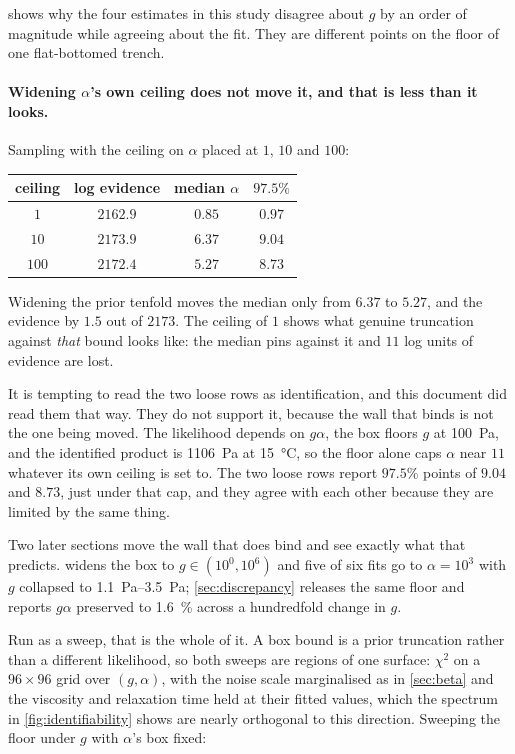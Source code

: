\documentclass[10pt]{article}
\begin{document}
 shows why the four estimates in this study disagree about $g$ by an order of
magnitude while agreeing about the fit. They are different points on the floor of one
flat-bottomed trench.

\paragraph{Widening $\alpha$'s own ceiling does not move it, and that is less than it looks.}
Sampling with the ceiling on $\alpha$ placed at $1$, $10$ and $100$:

\begin{center}
\begin{tabular}{cccc}
\toprule
ceiling & log evidence & median $\alpha$ & $97.5\%$ \\
\midrule
$1$ & $2162.9$ & $0.85$ & $0.97$ \\
$10$ & $2173.9$ & $6.37$ & $9.04$ \\
$100$ & $2172.4$ & $5.27$ & $8.73$ \\
\bottomrule
\end{tabular}
\end{center}

Widening the prior tenfold moves the median only from $6.37$ to $5.27$, and the evidence by
$1.5$ out of $2173$. The ceiling of $1$ shows what genuine truncation against \emph{that} bound
looks like: the median pins against it and $11$ log units of evidence are lost.

It is tempting to read the two loose rows as identification, and this document did read them
that way. They do not support it, because the wall that binds is not the one being moved. The
likelihood depends on $g\alpha$, the box floors $g$ at \SI{100}{\pascal}, and the identified
product is \SI{1106}{\pascal} at \SI{15}{\celsius}, so the floor alone caps $\alpha$ near
$11$ whatever its own ceiling is set to. The two loose rows report $97.5\%$ points of $9.04$
and $8.73$, just under that cap, and they agree with each other because they are limited by the
same thing.

Two later sections move the wall that does bind and see exactly what that predicts.
 widens the box to $g\in(10^0,10^6)$ and five of six fits go to
$\alpha=10^3$ with $g$ collapsed to \SIrange{1.1}{3.5}{\pascal}; \cref{sec:discrepancy}
releases the same floor and reports $g\alpha$ preserved to \SI{1.6}{\percent} across a
hundredfold change in $g$.

Run as a sweep, that is the whole of it. A box bound is a prior truncation rather than a
different likelihood, so both sweeps are regions of one surface: $\chi^2$ on a $96\times96$ grid
over $(g,\alpha)$, with the noise scale marginalised as in \cref{sec:beta} and the viscosity and
relaxation time held at their fitted values, which the spectrum in \cref{fig:identifiability}
shows are nearly orthogonal to this direction. Sweeping the floor under $g$ with $\alpha$'s box
fixed:
\end{document}
